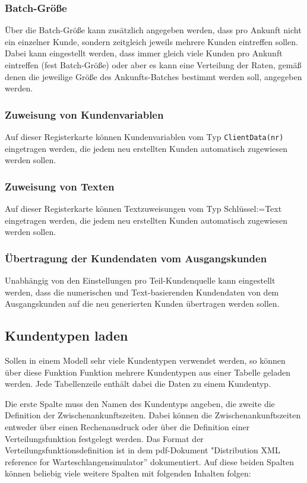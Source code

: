 \subsubsection*{Batch-Größe}

Über die Batch-Größe kann zusätzlich
angegeben werden, dass pro Ankunft nicht ein einzelner Kunde, sondern zeitgleich jeweils
mehrere Kunden eintreffen sollen. Dabei kann eingestellt werden, dass immer gleich
viele Kunden pro Ankunft eintreffen (fest Batch-Größe) oder aber es kann eine Verteilung
der Raten, gemäß denen die jeweilige Größe des Ankunfts-Batches bestimmt werden soll,
angegeben werden.

\subsubsection*{Zuweisung von Kundenvariablen}

Auf dieser Registerkarte können Kundenvariablen vom Typ \texttt{ClientData(nr)} eingetragen werden,
die jedem neu erstellten Kunden automatisch zugewiesen werden sollen.

\subsubsection*{Zuweisung von Texten}

Auf dieser Registerkarte können Textzuweisungen vom Typ Schlüssel:=Text eingetragen werden,
die jedem neu erstellten Kunden automatisch zugewiesen werden sollen.

\subsubsection*{Übertragung der Kundendaten vom Ausgangskunden}

Unabhängig von den Einstellungen pro Teil-Kundenquelle kann eingestellt werden,
dass die numerischen und Text-basierenden Kundendaten von dem Ausgangskunden
auf die neu generierten Kunden übertragen werden sollen.

\subsection*{Kundentypen laden}

Sollen in einem Modell sehr viele Kundentypen verwendet werden, so können über diese Funktion Funktion mehrere
Kundentypen aus einer Tabelle geladen werden. Jede Tabellenzeile enthält dabei die Daten zu einem Kundentyp.

Die erste Spalte muss den Namen des Kundentyps angeben, die zweite die Definition der Zwischenankunftszeiten.
Dabei können die Zwischenankunftszeiten entweder über einen Rechenausdruck oder über die Definition einer
Verteilungsfunktion festgelegt werden. Das Format der Verteilungsfunktionsdefinition ist in dem pdf-Dokument
"Distribution XML reference for Warteschlangensimulator'' dokumentiert. Auf diese beiden Spalten können beliebig
viele weitere Spalten mit folgenden Inhalten folgen:

